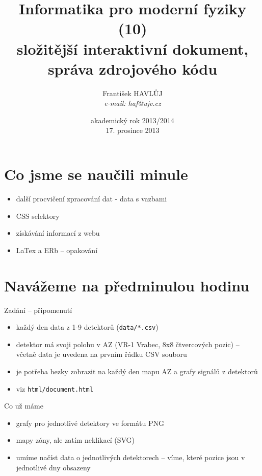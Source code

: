 \documentclass{beamer}
\title[IMF (10)]{Informatika pro moderní fyziky (10)\\ složitější interaktivní dokument, správa zdrojového kódu}
\author[Franti\v{s}ek HAVL\r{U}J, ORF ÚJV Řež]{Franti\v{s}ek HAVL\r{U}J\\{\scriptsize \emph{e-mail: haf@ujv.cz}}}
\date{akademický rok 2013/2014\\17. prosince 2013}
\institute[ORF ÚJV Řež]
{ÚJV Řež\\oddělení Reaktorové fyziky a podpory palivového cyklu}
\begin{document}
\begin{frame}
  \titlepage
\end{frame}

\begin{frame}
  \tableofcontents
\end{frame}

\section{Co jsme se naučili minule}

\begin{frame}{}
  \begin{itemize}
    \item další procvičení zpracování dat - data s vazbami
    \item CSS selektory
    \item získávání informací z webu
    \item LaTex a ERb -- opakování
  \end{itemize}
\end{frame}

\section{Navážeme na předminulou hodinu}

\begin{frame}{Zadání -- připomenutí}
  \begin{itemize}
    \item každý den data z 1-9 detektorů (\texttt{data/*.csv})
    \item detektor má svoji polohu v AZ (VR-1 Vrabec, 8x8 čtvercových pozic) -- včetně data je uvedena na prvním řádku CSV souboru
    \item je potřeba hezky zobrazit na každý den mapu AZ a grafy signálů z detektorů
    \item viz \texttt{html/document.html}
  \end{itemize}
\end{frame}

\begin{frame}{Co už máme}
  \begin{itemize}
    \item grafy pro jednotlivé detektory ve formátu PNG
    \item mapy zóny, ale zatím neklikací (SVG)
    \item umíme načíst data o jednotlivých detektorech -- víme, které pozice jsou v jednotlivé dny obsazeny
  \end{itemize}
\end{frame}
\end{document}
